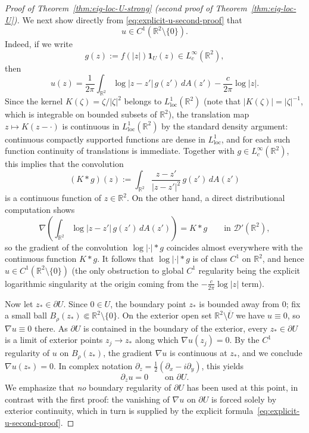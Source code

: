 \documentclass[a4paper,11pt,reqno]{amsart}
\numberwithin{equation}{section}
\theoremstyle{plain} %
\theoremstyle{definition} %
\theoremstyle{remark}
\newcommand{\R}{\mathbb{R}}
\begin{document}
\begin{proof}[Proof of Theorem~\ref{thm:eig-loc-U-strong} (second proof of Theorem~\ref{thm:eig-loc-U})]
We next show directly from \eqref{eq:explicit-u-second-proof} that
\[
u\in C^1(\R^2\setminus\{0\}).
\]
Indeed, if we write
\[
g(z):=f(|z|)\mathbf{1}_U(z)\in L^\infty_c(\R^2),
\]
then
\[
u(z)=\frac{1}{2\pi}\int_{\R^2}\log|z-z'|\,g(z')\,dA(z')-\frac{c}{2\pi}\log|z|.
\]
Since the kernel \(K(\zeta)=\zeta/|\zeta|^2\) belongs to \(L^1_{\mathrm{loc}}(\R^2)\) (note that
\(|K(\zeta)|=|\zeta|^{-1}\), which is integrable on bounded subsets of \(\R^2\)), the translation
map \(z\mapsto K(z-\cdot)\) is continuous in \(L^1_{\mathrm{loc}}(\R^2)\) by the standard density
argument: continuous compactly supported functions are dense in \(L^1_{\mathrm{loc}}\), and for
each such function continuity of translations is immediate. Together with \(g\in L^\infty_c(\R^2)\),
this implies that the convolution
\[
(K\ast g)(z):=\int_{\R^2}\frac{z-z'}{|z-z'|^2}\,g(z')\,dA(z')
\]
is a continuous function of \(z\in\R^2\). On the other hand, a direct distributional computation
shows
\[
\nabla\!\left(\int_{\R^2}\log|z-z'|\,g(z')\,dA(z')\right)=K\ast g
\qquad\text{in }\mathcal D'(\R^2),
\]
so the gradient of the convolution \(\log|\cdot|\ast g\) coincides almost everywhere with the
continuous function \(K\ast g\). It follows that \(\log|\cdot|\ast g\) is of class \(C^1\) on
\(\R^2\), and hence \(u\in C^1(\R^2\setminus\{0\})\) (the only obstruction to global \(C^1\)
regularity being the explicit logarithmic singularity at the origin coming from the
\(-\frac{c}{2\pi}\log|z|\) term).

Now let \(z_*\in\partial U\). Since \(0\in U\), the boundary point \(z_*\) is bounded away from
\(0\); fix a small ball \(B_\rho(z_*)\Subset \R^2\setminus\{0\}\). On the exterior open set
\(\R^2\setminus \overline U\) we have \(u\equiv 0\), so \(\nabla u\equiv 0\) there. As
\(\partial U\) is contained in the boundary of the exterior, every \(z_*\in\partial U\) is a limit
of exterior points \(z_j\to z_*\) along which \(\nabla u(z_j)=0\). By the \(C^1\) regularity of
\(u\) on \(B_\rho(z_*)\), the gradient \(\nabla u\) is continuous at \(z_*\), and we conclude
\(\nabla u(z_*)=0\). In complex notation \(\partial_z=\tfrac{1}{2}(\partial_x-i\partial_y)\), this
yields
\begin{equation}\label{eq:dz-zero-second-proof}
\partial_z u=0
\qquad\text{on }\partial U.
\end{equation}
We emphasize that \emph{no} boundary regularity of \(\partial U\) has been used at this point, in
contrast with the first proof: the vanishing of \(\nabla u\) on \(\partial U\) is forced solely by
exterior continuity, which in turn is supplied by the explicit
formula~\eqref{eq:explicit-u-second-proof}.


\end{proof}
\end{document}

